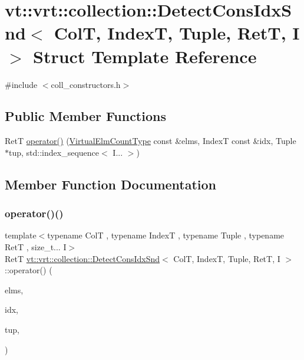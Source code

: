 \hypertarget{structvt_1_1vrt_1_1collection_1_1_detect_cons_idx_snd}{}\section{vt\+:\+:vrt\+:\+:collection\+:\+:Detect\+Cons\+Idx\+Snd$<$ ColT, IndexT, Tuple, RetT, I $>$ Struct Template Reference}
\label{structvt_1_1vrt_1_1collection_1_1_detect_cons_idx_snd}


{\ttfamily \#include $<$coll\+\_\+constructors.\+h$>$}

\subsection*{Public Member Functions}
\begin{DoxyCompactItemize}
\item 
RetT \hyperlink{structvt_1_1vrt_1_1collection_1_1_detect_cons_idx_snd_a0360a0749c16a7ee93481ff7e3b9994c}{operator()} (\hyperlink{namespacevt_ac115668758184050beff7a9281a2c490}{Virtual\+Elm\+Count\+Type} const \&elms, IndexT const \&idx, Tuple $\ast$tup, std\+::index\+\_\+sequence$<$ I... $>$)
\end{DoxyCompactItemize}


\subsection{Member Function Documentation}
\mbox{\label{structvt_1_1vrt_1_1collection_1_1_detect_cons_idx_snd_a0360a0749c16a7ee93481ff7e3b9994c}} 
\subsubsection{\texorpdfstring{operator()()}{operator()()}}
{\footnotesize\ttfamily template$<$typename ColT , typename IndexT , typename Tuple , typename RetT , size\+\_\+t... I$>$ \\
RetT \hyperlink{structvt_1_1vrt_1_1collection_1_1_detect_cons_idx_snd}{vt\+::vrt\+::collection\+::\+Detect\+Cons\+Idx\+Snd}$<$ ColT, IndexT, Tuple, RetT, I $>$\+::operator() (\begin{DoxyParamCaption}\item[{\hyperlink{namespacevt_ac115668758184050beff7a9281a2c490}{Virtual\+Elm\+Count\+Type} const \&}]{elms,  }\item[{IndexT const \&}]{idx,  }\item[{Tuple $\ast$}]{tup,  }\item[{std\+::index\+\_\+sequence$<$ I... $>$}]{ }\end{DoxyParamCaption})\hspace{0.3cm}{\ttfamily [inline]}}



